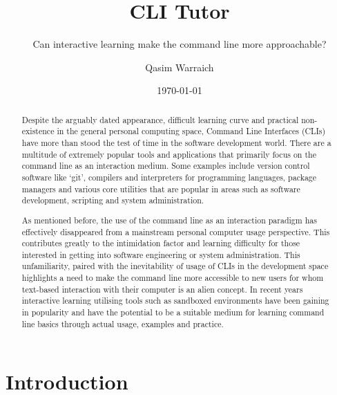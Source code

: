 \documentclass{seal_thesis}
\date{\today}
\title{CLI Tutor}
\subtitle{Can interactive learning make the command line more approachable?}
\author{Qasim Warraich}
\begin{document}
\maketitle

\frontmatter


\begin{abstract}
Despite the arguably dated appearance, difficult learning curve and practical
non-existence in the general personal computing space, Command Line Interfaces
(CLIs) have more than stood the test of time in the software development world.
There are a multitude of extremely popular tools and applications that
primarily focus on the command line as an interaction medium. Some examples
include version control software like `git', compilers and interpreters for
programming languages, package managers and various core utilities that are
popular in areas such as software development, scripting and system
administration.

As mentioned before, the use of the command line as an interaction paradigm has
effectively disappeared from a mainstream personal computer usage perspective.
This contributes greatly to the intimidation factor and learning difficulty for
those interested in getting into software engineering or system administration.
This unfamiliarity, paired with the inevitability of usage of CLIs in the
development space highlights a need to make the command line more accessible to
new users for whom text-based interaction with their computer is an alien
concept. In recent years interactive learning utilising tools such as sandboxed
environments have been gaining in popularity and have the potential to be a
suitable medium for learning command line basics through actual usage, examples
and practice.

\end{abstract}


\begin{zusammenfassung}
\end{zusammenfassung}

\tableofcontents
\listoffigures
\listoftables
\lstlistoflistings

\mainmatter
\chapter{Introduction}
\end{document}
